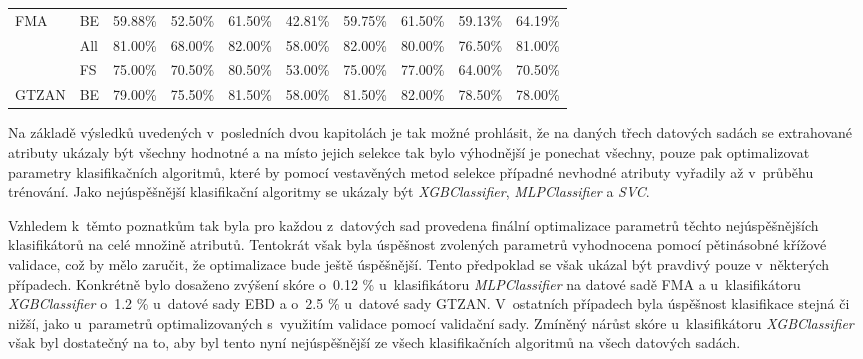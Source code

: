 \begin{table}[H]
{\begin{tabular}{llllllllll}
    \multirow{-3}{*}{FMA}   & \multicolumn{1}{l|}{\cellcolor[HTML]{EFEFEF}BE}  & \cellcolor[HTML]{EFEFEF}59.88\% & \cellcolor[HTML]{EFEFEF}52.50\% & \cellcolor[HTML]{EFEFEF}61.50\% & \cellcolor[HTML]{EFEFEF}42.81\% & \cellcolor[HTML]{EFEFEF}59.75\% & \cellcolor[HTML]{EFEFEF}61.50\% & \cellcolor[HTML]{EFEFEF}59.13\% & \cellcolor[HTML]{EFEFEF}64.19\% \\ \cline{1-2}
                            & \multicolumn{1}{l|}{All}                         & 81.00\%                         & 68.00\%                         & 82.00\%                         & 58.00\%                         & 82.00\%                         & 80.00\%                         & 76.50\%                         & 81.00\%                         \\
                            & \multicolumn{1}{l|}{\cellcolor[HTML]{EFEFEF}FS}  & \cellcolor[HTML]{EFEFEF}75.00\% & \cellcolor[HTML]{EFEFEF}70.50\% & \cellcolor[HTML]{EFEFEF}80.50\% & \cellcolor[HTML]{EFEFEF}53.00\% & \cellcolor[HTML]{EFEFEF}75.00\% & \cellcolor[HTML]{EFEFEF}77.00\% & \cellcolor[HTML]{EFEFEF}64.00\% & \cellcolor[HTML]{EFEFEF}70.50\% \\
    \multirow{-3}{*}{GTZAN} & \multicolumn{1}{l|}{BE}                          & 79.00\%                         & 75.50\%                         & 81.50\%                         & 58.00\%                         & 81.50\%                         & 82.00\%                         & 78.50\%                         & 78.00\%                        
    \end{tabular}}
\end{table}

Na základě výsledků uvedených v~posledních dvou kapitolách je tak možné prohlásit, že na daných třech datových sadách se extrahované atributy ukázaly být všechny hodnotné a na místo jejich selekce tak bylo výhodnější je ponechat všechny, pouze pak optimalizovat parametry klasifikačních algoritmů, které by pomocí vestavěných metod selekce případné nevhodné atributy vyřadily až v~průběhu trénování. Jako nejúspěšnější klasifikační algoritmy se ukázaly být \textit{XGBClassifier}, \textit{MLPClassifier} a \textit{SVC}.

Vzhledem k~těmto poznatkům tak byla pro každou z~datových sad provedena finální optimalizace parametrů těchto nejúspěšnějších klasifikátorů na celé množině atributů. Tentokrát však byla úspěšnost zvolených parametrů vyhodnocena pomocí pětinásobné křížové validace, což by mělo zaručit, že optimalizace bude ještě úspěšnější. Tento předpoklad se však ukázal být pravdivý pouze v~některých případech. Konkrétně bylo dosaženo zvýšení skóre o~0.12 \% u~klasifikátoru \textit{MLPClassifier} na datové sadě FMA a u~klasifikátoru \textit{XGBClassifier} o~1.2 \% u~datové sady EBD a o~2.5 \% u~datové sady GTZAN. V~ostatních případech byla úspěšnost klasifikace stejná či nižší, jako u~parametrů optimalizovaných s~využitím validace pomocí validační sady. Zmíněný nárůst skóre u~klasifikátoru \textit{XGBClassifier} však byl dostatečný na to, aby byl tento nyní nejúspěšnější ze všech klasifikačních algoritmů na všech datových sadách.

